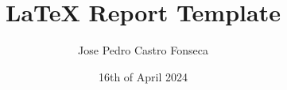 \documentclass[]{iisreport}
\title{\LaTeX{} Report Template}
\author{Jose Pedro Castro Fonseca}
\date{16th of April 2024}
\begin{document}
\frontmatter





\tableofcontents

\mainmatter



%




\appendix



\backmatter


\listofacronyms

\listoffigures
\listoftables


\end{document}
